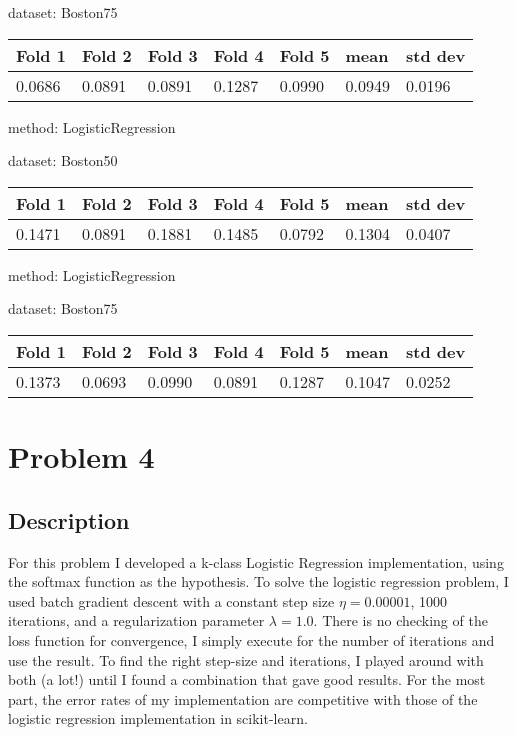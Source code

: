 \documentclass{article}
\begin{document}
\noindent dataset: Boston75

\begin{center}
	\begin{tabular}  { | l | l | l | l | l | l | l | }
	\hline
	Fold 1 & Fold 2 & Fold 3 & Fold 4 & Fold 5 & mean & std dev\\ \hline
	0.0686 & 0.0891 & 0.0891 & 0.1287 & 0.0990 & 0.0949 & 0.0196\\
	\hline
	\end{tabular}
\end{center}
\noindent method: LogisticRegression

\noindent dataset: Boston50

\begin{center}
	\begin{tabular}  { | l | l | l | l | l | l | l | }
	\hline
	Fold 1 & Fold 2 & Fold 3 & Fold 4 & Fold 5 & mean & std dev\\ \hline
	0.1471 & 0.0891 & 0.1881 & 0.1485 & 0.0792 & 0.1304 & 0.0407\\
	\hline
	\end{tabular}
\end{center}
\noindent method: LogisticRegression

\noindent dataset: Boston75

\begin{center}
	\begin{tabular}  { | l | l | l | l | l | l | l | }
	\hline
	Fold 1 & Fold 2 & Fold 3 & Fold 4 & Fold 5 & mean & std dev\\ \hline
	0.1373 & 0.0693 & 0.0990 & 0.0891 & 0.1287 & 0.1047 & 0.0252\\
	\hline
	\end{tabular}
\end{center}


\section{Problem 4}

\subsection{Description}

For this problem I developed a k-class Logistic Regression implementation, using the softmax function as the hypothesis.  To solve the logistic regression problem, I used batch gradient descent with a constant step size $\eta = 0.00001$, 1000 iterations, and a regularization parameter $\lambda = 1.0$.  There is no checking of the loss function for convergence, I simply execute for the number of iterations and use the result.  To find the right step-size and iterations, I played around with both (a lot!) until I found a combination that gave good results.  For the most part, the error rates of my implementation are competitive with those of the logistic regression implementation in scikit-learn.
\end{document}
